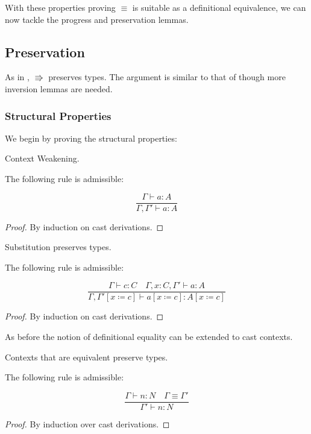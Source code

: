 With these properties proving $\equiv$ is suitable as a definitional equivalence, we can now tackle the progress and preservation lemmas.
 
\subsection{Preservation}
 
As in , $\Rrightarrow$ preserves types.
The argument is similar to that of  though more inversion lemmas are needed.
 
\subsubsection{Structural Properties}
We begin by proving the structural properties:
\begin{lem} Context Weakening.
 
The following rule is admissible:
 
\[
\frac{\Gamma \vdash a:A}{\Gamma ,\Gamma' \vdash a:A}
\]
\end{lem}
 
\begin{proof}
By induction on cast derivations.
\end{proof}

\begin{lem} Substitution preserves types.
 
The following rule is admissible:
 
\[
\frac{\Gamma \vdash c:C \quad \Gamma, x:C, \Gamma' \vdash a:A}{\Gamma, \Gamma' \left[x\coloneqq c\right]\vdash a\left[x\coloneqq c\right]:A\left[x\coloneqq c\right]}
\]
\end{lem}
\begin{proof}
By induction on cast derivations.
\end{proof}

As before the notion of definitional equality can be extended to cast contexts. %
 
 
 
\begin{lem}Contexts that are equivalent preserve types.
 
The following rule is admissible:
 
\[
\frac{\Gamma\vdash n:N\quad\Gamma\equiv\Gamma'}{\Gamma'\vdash n:N}
\]
\end{lem}
\begin{proof}
By induction over cast derivations.
\end{proof}

